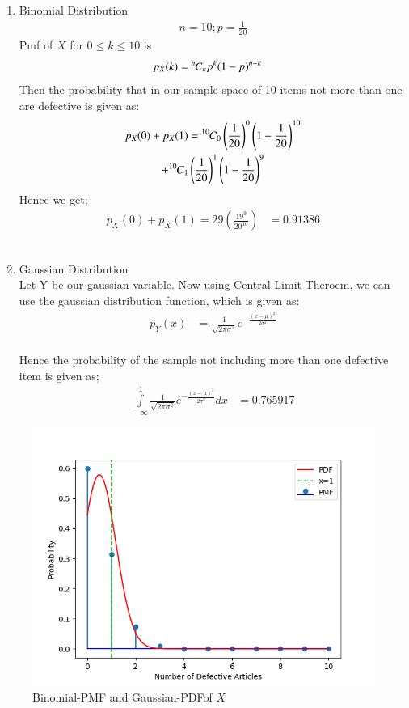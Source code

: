 \documentclass[journal,12pt,twocolumn]{IEEEtran}
\theoremstyle{remark}
\begin{document}
\begin{enumerate}
    \item Binomial Distribution
\begin{align}
n=10 ; p=\frac{1}{20}
\end{align}
Pmf of $X$ for $0 \leq k \leq 10$ is
\begin{align}
p_X(k)&={{}^{n}\mkern-1muC_{k}}p^k(1-p)^{n-k}
\end{align}
Then the probability that in our sample space of 10 items not more than one are defective is given as:
\begin{multline}
p_X(0)+p_X(1)={{}^{10}\mkern-1muC_{0}}\left(\frac{1}{20}\right)^0\left(1-\frac{1}{20}\right)^{10}\\
+{{}^{10}\mkern-1muC_{1}}\left(\frac{1}{20}\right)^1\left(1-\frac{1}{20}\right)^{9}
\end{multline}
Hence we get;
\begin{align}
p_X(0)+p_X(1)=29\left(\frac{19^9}{20^{10}}\right)
            &=0.91386
\end{align}\\
\item Gaussian Distribution\\
Let Y be our gaussian variable. Now using Central Limit Theroem, we can use the gaussian
distribution function, which is given as:
\begin{align}
p_Y(x)&=\frac{1}{\sqrt{2\pi\sigma^2}}e^{-\frac{(x-\mu)^2}{2\sigma^2}}
\end{align}\\
Hence the probability of the sample not including more than one defective item is given as;
\begin{align}
    \int\limits_{-\infty}^1 \frac{1}{\sqrt{2\pi\sigma^2}}e^{-\frac{(x-\mu)^2}{2\sigma^2}}dx
    &= 0.765917
\end{align}
\end{enumerate}
\begin{figure}[ht]
    \centering
    \includegraphics[width=\columnwidth]{./figs/figure1.png}
    \caption{ Binomial-PMF and Gaussian-PDFof $X$}
\end{figure}
\end{document}
